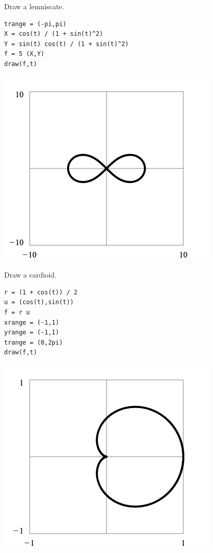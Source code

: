 \newpage

\noindent
Draw a lemniscate.

{\color{blue}
\begin{verbatim}
trange = (-pi,pi)
X = cos(t) / (1 + sin(t)^2)
Y = sin(t) cos(t) / (1 + sin(t)^2)
f = 5 (X,Y)
draw(f,t)
\end{verbatim}
}

\begin{center}
\includegraphics[scale=0.4]{lemniscate.png}
\end{center}

\noindent
Draw a cardioid.

{\color{blue}
\begin{verbatim}
r = (1 + cos(t)) / 2
u = (cos(t),sin(t))
f = r u
xrange = (-1,1)
yrange = (-1,1)
trange = (0,2pi)
draw(f,t)
\end{verbatim}
}

\begin{center}
\includegraphics[scale=0.4]{cardioid.png}
\end{center}
